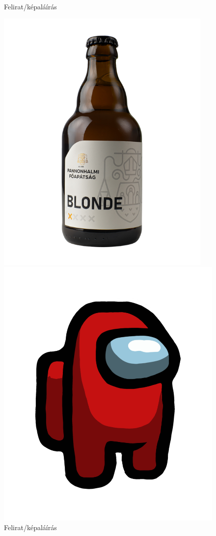 \documentclass{article}
\begin{document}
\hulipsum[1]

\begin{figure}[bt] %
\centering
\label{fig:kepek}
\caption{Felirat/képaláírás}
\includegraphics[width=0.5\linewidth]{pia}
\caption{Felirat/képaláírás}
\includegraphics[width=0.5\linewidth, angle = 90]{among}
\end{figure}

\hulipsum[1]
\end{document}
